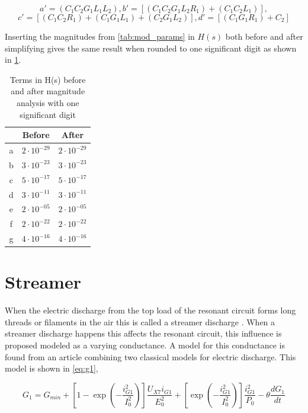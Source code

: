 \begin{equation} \label{eq:ab_simp}
    a' = (C_1 C_2 G_1 L_1 L_2), b' = [(C_1 C_2 G_1 L_2 R_1)+(C_1 C_2 L_1)],
\end{equation}
\begin{equation} \label{eq:cd_simp}
    c' = [(C_1 C_2 R_1)+(C_1 G_1 L_1)+(C_2 G_1 L_2)], d' = [(C_1 G_1 R_1) + C_2]
\end{equation}

Inserting the magnitudes from \cref{tab:mod_params} in $H(s)$ both before and after simplifying gives the same result when rounded to one significant digit as shown in \cref{tab:beforeafter}.

\begin{table}[H]
    \centering
    \begin{tabular}{c|c|c}
          & Before             & After \\ \hline
        a & $2 \cdot 10^{-29}$ & $2 \cdot 10^{-29}$ \\
        b & $3 \cdot 10^{-23}$ & $3 \cdot 10^{-23}$ \\
        c & $5 \cdot 10^{-17}$ & $5 \cdot 10^{-17}$ \\
        d & $3 \cdot 10^{-11}$ & $3 \cdot 10^{-11}$ \\
        e & $2 \cdot 10^{-05}$ & $2 \cdot 10^{-05}$ \\
        f & $2 \cdot 10^{-22}$ & $2 \cdot 10^{-22}$ \\
        g & $4 \cdot 10^{-16}$ & $4 \cdot 10^{-16}$ \\
    \end{tabular}
    \caption{Terms in H(s) before and after magnitude analysis with one significant digit}
    \label{tab:beforeafter}
\end{table}

\section{Streamer}
\label{sec:arc}

When the electric discharge from the top load of the resonant circuit forms long threads or filaments in the air this is called a streamer discharge \citep{streamer}. When a streamer discharge happens this affects the resonant circuit, this influence is proposed modeled as a varying conductance. A model for this conductance is found from an article \citep{575670} combining two classical models for electric discharge. This model is shown in \cref{eq:g1},

\begin{equation} \label{eq:g1}
    G_1 = G_{min} + [ 1 - \exp(-\frac{i_{G1}^2}{I_0^2})] \frac{U_{X7} i_{G1}}{E_0^2} + [\exp(-\frac{i_{G1}^2}{I_0^2})] \frac{i_{G1}^2}{P_0} - \theta \frac{d G_1}{dt}
\end{equation}

